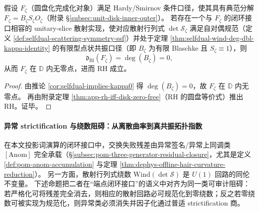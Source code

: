 \begin{theorem}\label{thm:xi-selfdual-scattering-sufficient-rh}
假设 \(F_{\zeta}\)（圆盘化完成化对象）满足 Hardy/Smirnov 条件口径，使其具有典范分解 \(F_{\zeta}=B_{\zeta}S_{\zeta}O_{\zeta}\)（附录 \S\ref{subsec:unit-disk-inner-outer}）。
若存在一个与 \(F_{\zeta}\) 的闭环接口相容的 unitary-slice 散射实现，使对应散射行列式 \(\det\mathcal S_{\zeta}\) 满足自对偶规范（定义 \ref{def:selfdual-scattering-symmetry-ssf}）并处于定理 \ref{thm:selfdual-wind-deg-dbl-kappa-identity} 的有限型点状共振口径（即 \(B_{\zeta}\) 为有限 Blaschke 且 \(S_{\zeta}\equiv 1\)），则
\[
\mathfrak d_{\mathrm{Bl}}(F_{\zeta})=\deg(B_{\zeta})=0,
\]
从而 \(F_{\zeta}\) 在 \(\mathbb{D}\) 内无零点，进而 RH 成立。
\end{theorem}

\begin{proof}
由推论 \ref{cor:selfdual-implies-kappa0} 得 \(\deg(B_{\zeta})=0\)，故 \(F_{\zeta}\) 在 \(\mathbb{D}\) 内无零点。
再由附录定理 \ref{thm:app-rh-iff-disk-zero-free}（RH 的圆盘等价式）推出 RH。证毕。
\end{proof}

\paragraph{异常 strictification 与绕数阻碍：从离散曲率到真共振拓扑指数}
在本文投影词演算的闭环接口中，交换失败残差由异常签名/异常上同调类 \([\mathrm{Anom}]\) 完全承载（\S\ref{subsec:pom-three-generator-residual-closure}，尤其是定义 \ref{def:pom-anom-accumulation} 与定理 \ref{thm:dephys-offline-hair-curvature-reduction}）。
另一方面，散射行列式绕数 \(\mathrm{Wind}(\det\mathcal S)\) 是 \(U(1)\) 回路的同伦不变量。
下述命题把二者在“端点闭环接口”的语义中对齐为同一类可审计阻碍：若严格化可将残差完全消去，则相应的散射回路必可规范化到零绕数；反之若零绕数可被实现为规范化，则异常类必须消失并因子化通过普适 strictification 商。

